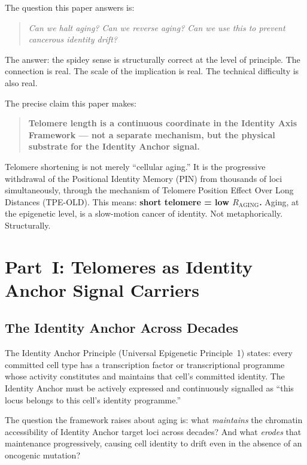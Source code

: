\documentclass[12pt,a4paper]{article}
\newcommand{\raging}{$R_{\mathrm{AGING}}$}
\newcommand{\tpeold}{TPE-OLD}
\begin{document}
The question this paper answers is:

\begin{quote}
\textit{Can we halt aging? Can we reverse aging? Can we use this to prevent
cancerous identity drift?}
\end{quote}

The answer: the spidey sense is structurally correct at the level of principle.
The connection is real. The scale of the implication is real. The technical
difficulty is also real.

The precise claim this paper makes:

\begin{quote}
\textbf{Telomere length is a continuous coordinate in the Identity Axis
Framework --- not a separate mechanism, but the physical substrate for the
Identity Anchor signal.}
\end{quote}

Telomere shortening is not merely ``cellular aging.'' It is the progressive
withdrawal of the Positional Identity Memory (PIN) from thousands of loci
simultaneously, through the mechanism of Telomere Position Effect Over Long
Distances (\tpeold{}). This means: \textbf{short telomere = low \raging{}.}
Aging, at the epigenetic level, is a slow-motion cancer of identity. Not
metaphorically. Structurally.

\section{Part~I: Telomeres as Identity Anchor Signal Carriers}

\subsection{The Identity Anchor Across Decades}

The Identity Anchor Principle (Universal Epigenetic Principle~1) states:
every committed cell type has a transcription factor or transcriptional
programme whose activity constitutes and maintains that cell's committed
identity. The Identity Anchor must be actively expressed and continuously
signalled as ``this locus belongs to this cell's identity programme.''

The question the framework raises about aging is: what \textit{maintains}
the chromatin accessibility of Identity Anchor target loci across decades?
And what \textit{erodes} that maintenance progressively, causing cell
identity to drift even in the absence of an oncogenic mutation?
\end{document}
